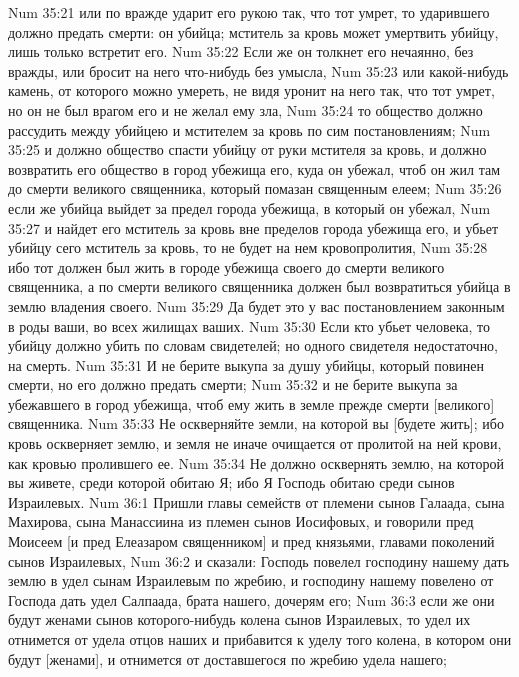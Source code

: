 \vs Num 35:21 или по вражде ударит его рукою так, что тот умрет, то ударившего должно предать смерти: он убийца; мститель за кровь может умертвить убийцу, лишь только встретит его.
\vs Num 35:22 Если же он толкнет его нечаянно, без вражды, или бросит на него что-нибудь без умысла,
\vs Num 35:23 или какой-нибудь камень, от которого можно умереть, не видя уронит на него так, что тот умрет, но он не был врагом его и не желал ему зла,
\vs Num 35:24 то общество должно рассудить между убийцею и мстителем за кровь по сим постановлениям;
\vs Num 35:25 и должно общество спасти убийцу от руки мстителя за кровь, и должно возвратить его общество в город убежища его, куда он убежал, чтоб он жил там до смерти великого священника, который помазан священным елеем;
\vs Num 35:26 если же убийца выйдет за предел города убежища, в который он убежал,
\vs Num 35:27 и найдет его мститель за кровь вне пределов города убежища его, и убьет убийцу сего мститель за кровь, то не будет на нем  кровопролития,
\vs Num 35:28 ибо тот должен был жить в городе убежища своего до смерти великого священника, а по смерти великого священника должен был возвратиться убийца в землю владения своего.
\vs Num 35:29 Да будет это у вас постановлением законным в роды ваши, во всех жилищах ваших.
\vs Num 35:30 Если кто убьет человека, то убийцу должно убить по словам свидетелей; но одного свидетеля недостаточно,  на смерть.
\vs Num 35:31 И не берите выкупа за душу убийцы, который повинен смерти, но его должно предать смерти;
\vs Num 35:32 и не берите выкупа за убежавшего в город убежища, чтоб ему  жить в земле  прежде смерти [великого] священника.
\vs Num 35:33 Не оскверняйте земли, на которой вы [будете жить]; ибо кровь оскверняет землю, и земля не иначе очищается от пролитой на ней крови, как кровью пролившего ее.
\vs Num 35:34 Не должно осквернять землю, на которой вы живете, среди которой обитаю Я; ибо Я Господь обитаю среди сынов Израилевых.
\vs Num 36:1 Пришли главы семейств от племени сынов Галаада, сына Махирова, сына Манассиина из племен сынов Иосифовых, и говорили пред Моисеем [и пред Елеазаром священником] и пред князьями, главами поколений сынов Израилевых,
\vs Num 36:2 и сказали: Господь повелел господину нашему дать землю в удел сынам Израилевым по жребию, и господину нашему повелено от Господа дать удел Салпаада, брата нашего, дочерям его;
\vs Num 36:3 если же они будут женами сынов которого-нибудь  колена сынов Израилевых, то удел их отнимется от удела отцов наших и прибавится к уделу того колена, в котором они будут [женами], и отнимется от доставшегося по жребию удела нашего;
